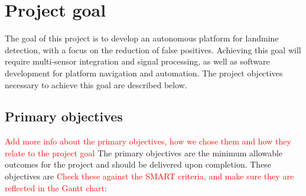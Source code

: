 \documentclass[main.tex]{subfiles}
\begin{document}
\section{Project goal}

The goal of this project is to develop an autonomous platform for landmine detection, with a focus on the reduction of false positives. Achieving this goal will require multi-sensor integration and signal processing, as well as software development for platform navigation and automation. The project objectives necessary to achieve this goal are described below.
 
\subsection{Primary objectives}
\textcolor{red}{Add more info about the primary objectives, how we chose them and how they relate to the project goal}
The primary objectives are the minimum allowable outcomes for the project and should be delivered upon completion. These objectives are \textcolor{red}{Check these against the SMART criteria, and make sure they are reflected in the Gantt chart}:
\end{document}
